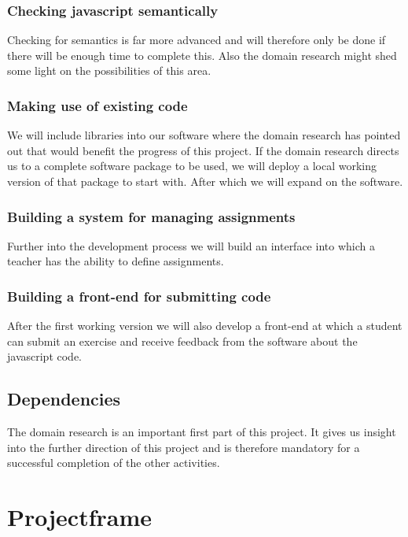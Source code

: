 \documentclass{article}
\begin{document}
\subsubsection{Checking javascript semantically}
Checking for semantics is far more advanced and will therefore only be done if there will be enough time to complete this. Also the domain research might shed some light on the possibilities of this area.
\subsubsection{Making use of existing code}
We will include libraries into our software where the domain research has pointed out that would benefit the progress of this project. If the domain research directs us to a complete software package to be used, we will deploy a local working version of that package to start with. After which we will expand on the software.
\subsubsection{Building a system for managing assignments}
Further into the development process we will build an interface into which a teacher has the ability to define assignments.
\subsubsection{Building a front-end for submitting code}
After the first working version we will also develop a front-end at which a student can submit an exercise and receive feedback from the software about the javascript code.
\subsection{Dependencies}
The domain research is an important first part of this project. It gives us insight into the further direction of this project and is therefore mandatory for a successful completion of the other activities.

\section{Projectframe}
\end{document}
